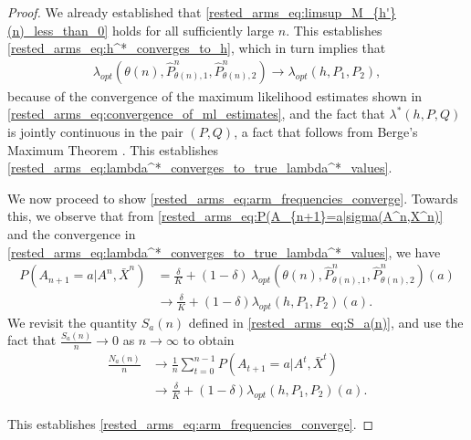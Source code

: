 \begin{proof}
We already established that \eqref{rested_arms_eq:limsup_M_{h'}(n)_less_than_0} holds for all sufficiently large $n$. This establishes \eqref{rested_arms_eq:h^*_converges_to_h}, which in turn implies that
\begingroup\allowdisplaybreaks\begin{align}
\lambda_{opt}(\theta(n),\hat{P}^n_{\theta(n),1},\hat{P}^n_{\theta(n),2})\to \lambda_{opt}(h,P_1,P_2),
\end{align}\endgroup
because of the convergence of the maximum likelihood estimates shown in \eqref{rested_arms_eq:convergence_of_ml_estimates}, and the fact that $\lambda^*(h,P,Q)$ is jointly continuous in the pair $(P,Q)$, a fact that follows from Berge's Maximum Theorem \cite{Ausubel1993}. This establishes \eqref{rested_arms_eq:lambda^*_converges_to_true_lambda^*_values}.

We now proceed to show \eqref{rested_arms_eq:arm_frequencies_converge}. Towards this, we observe that from \eqref{rested_arms_eq:P(A_{n+1}=a|sigma(A^n,X^n)} and the convergence in \eqref{rested_arms_eq:lambda^*_converges_to_true_lambda^*_values}, we have
\begingroup\allowdisplaybreaks\begin{align}
	P(A_{n+1}=a|A^n,\bar{X}^n)
	&=\frac{\delta}{K}+(1-\delta)\,\lambda_{opt}(\theta(n),\hat{P}^n_{\theta(n),1},\hat{P}^n_{\theta(n),2})(a)\nonumber\\
	&\to \frac{\delta}{K}+(1-\delta)\lambda_{opt}(h,P_1,P_2)(a).
\end{align}\endgroup
We revisit the quantity $S_a(n)$ defined in \eqref{rested_arms_eq:S_a(n)}, and use the fact that $\frac{S_a(n)}{n}\to 0$  as $n\to\infty$ to obtain
\begingroup\allowdisplaybreaks\begin{align}
	\frac{N_a(n)}{n}&\to \frac{1}{n}\sum\limits_{t=0}^{n-1}P(A_{t+1}=a|A^t,\bar{X}^t)\nonumber\\
	&\to \frac{\delta}{K}+(1-\delta)\lambda_{opt}(h,P_1,P_2)(a).
\end{align}\endgroup

This establishes \eqref{rested_arms_eq:arm_frequencies_converge}.


\end{proof}
